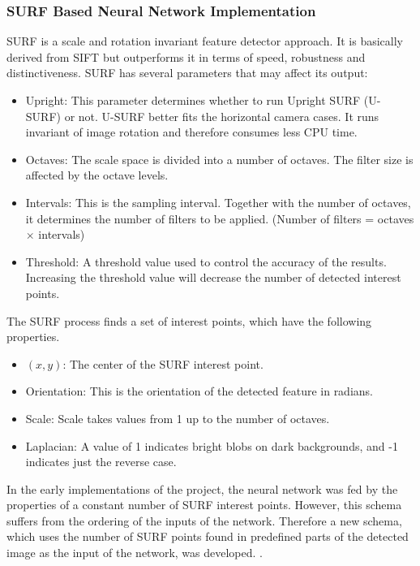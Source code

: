 \documentclass[a4paper,oneside,12pt]{report}
\begin{document}
\subsubsection{SURF Based Neural Network Implementation}
SURF \cite{bay_speeded-up_2008} is a scale and rotation invariant feature detector approach. It is basically derived from SIFT \cite{lowe_object_1999} but outperforms it in terms of speed, robustness and distinctiveness. SURF has several parameters that may affect its output:
\begin{itemize}
    \item Upright: This parameter determines whether to run Upright SURF (U-SURF) or not. U-SURF better fits the horizontal camera cases. It runs invariant of image rotation and therefore consumes less CPU time.
    \item Octaves: The scale space is divided into a number of octaves. The filter size is affected by the octave levels.
    \item Intervals: This is the sampling interval. Together with the number of octaves, it determines the number of filters to be applied. (Number of filters = octaves $\times$ intervals)
    \item Threshold: A threshold value used to control the accuracy of the results. Increasing the threshold value will decrease the number of detected interest points.
\end{itemize}
The SURF process finds a set of interest points, which have the following properties.
\begin{itemize}
    \item $(x, y)$: The center of the SURF interest point.
    \item Orientation: This is the orientation of the detected feature in radians. 
    \item Scale: Scale takes values from 1 up to the number of octaves.
    \item Laplacian: A value of 1 indicates bright blobs on dark backgrounds, and -1 indicates just the reverse case.
\end{itemize}
In the early implementations of the project, the neural network was fed by the properties of a constant number of SURF interest points. However, this schema suffers from the ordering of the inputs of the network. Therefore a new schema, which uses the number of SURF points found in predefined parts of the detected image as the input of the network, was developed. \cite{kurtul_road_2009}.
\end{document}
